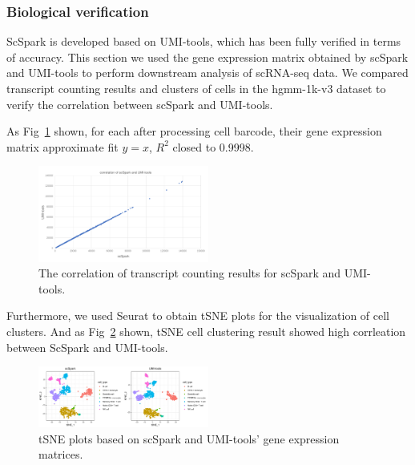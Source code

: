 \documentclass[10pt,journal,compsoc]{IEEEtran}
\begin{document}
\subsubsection{Biological verification}
ScSpark is developed based on UMI-tools, which has been fully verified in terms of accuracy. 
This section we used the gene expression matrix obtained by scSpark and UMI-tools to perform downstream analysis of scRNA-seq data. 
We compared transcript counting results and clusters of cells in the hgmm-1k-v3 dataset to verify the correlation between scSpark and UMI-tools. 

As Fig~\ref{fig9} shown, for each after processing cell barcode, their gene expression matrix approximate fit $y=x$, $R^{2}$ closed to 0.9998.
\begin{figure}
	\includegraphics[width=0.5\textwidth]{fig9.pdf}
	\caption{The correlation of transcript counting results for scSpark and UMI-tools.} \label{fig9}
\end{figure}
Furthermore, we used Seurat to obtain tSNE plots for the visualization of cell clusters. 
And as Fig~\ref{fig10} shown, tSNE cell clustering result showed high corrleation between ScSpark and UMI-tools.
\begin{figure}
	\includegraphics[width=0.5\textwidth]{fig10.pdf}
	\caption{tSNE plots based on scSpark and UMI-tools' gene expression matrices.} \label{fig10}
\end{figure}

%
%
\end{document}
